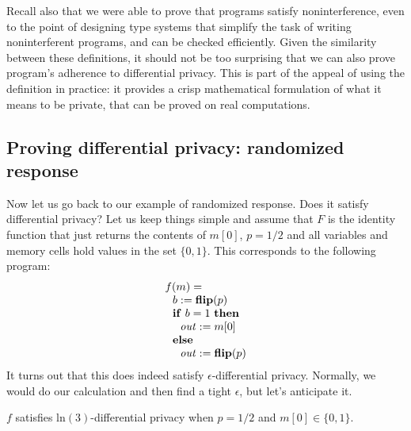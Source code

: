 \documentclass[11pt]{article}
\newcommand{\flip}{\mathbf{flip}}
\begin{document}
Recall also that we were able to prove that programs satisfy noninterference,
even to the point of designing type systems that simplify the task of writing
noninterferent programs, and can be checked efficiently. Given the similarity
between these definitions, it should not be too surprising that we can also
prove program's adherence to differential privacy. This is part of the appeal of
using the definition in practice: it provides a crisp mathematical formulation
of what it means to be private, that can be proved on real computations.

\subsection{Proving differential privacy: randomized response}

Now let us go back to our example of randomized response. Does it satisfy
differential privacy? Let us keep things simple and assume that $F$ is
the identity function that just returns the contents of $m[0]$, $p
= 1/2$ and all variables and memory cells hold values in the set
$\{0,1\}$. This corresponds to the following program:
\[
  \begin{array}{l}
    f(m) = \\
\ \ b := \flip(p) \\
\ \ \mathbf{if}\ b = 1\ \mathbf{then} \\
\ \ \ \ \mi{out} := m[0] \\
\ \ \mathbf{else} \\
\ \ \ \ \mi{out} := \flip(p)
  \end{array}
\]
It turns out that this does indeed satisfy $\epsilon$-differential privacy.
Normally, we would do our calculation and then find a tight $\epsilon$, but
let's anticipate it.

\begin{theorem}
\label{thm:randresp}
$f$ satisfies $\mathrm{ln}(3)$-differential privacy when $p = 1/2$
and $m[0] \in \{0,1\}$.
\end{theorem}
\end{document}
